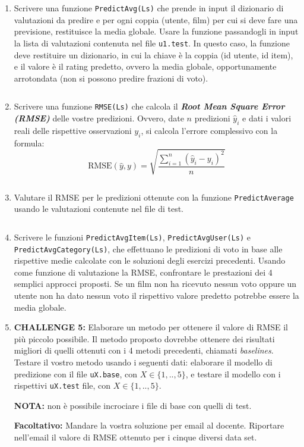 \documentclass[11pt,a4]{article}
\newcommand{\mybox}[2]{$\quad$\fbox{
\begin{minipage}{#1cm}
\hfill\vspace{#2cm}
\end{minipage}
}}
\begin{document}
\begin{enumerate}
\item Scrivere una funzione {\tt PredictAvg(Ls)} che prende in input il dizionario di valutazioni da predire
e per ogni coppia (utente, film) per cui si deve fare una previsione, restituisce la media globale.
Usare la funzione passandogli in input la lista di valutazioni contenuta nel file {\tt u1.test}.
In questo caso, la funzione deve restituire un dizionario, in cui la chiave è la coppia (id utente, id item), e il
valore è il rating predetto, ovvero la media globale, opportunamente arrotondata (non si possono predire frazioni di voto).

\mybox{15}{3}

\item Scrivere una funzione {\tt RMSE(Ls)} che calcola il {\bf {\it Root Mean Square Error (RMSE)}} delle vostre predizioni.
Ovvero, date $n$ predizioni $\hat{y}_i$ e dati i valori reali delle rispettive osservazioni $y_i$, si calcola l'errore complessivo con la formula:
$$
	\mbox{RMSE}(\hat{y}, y) = \sqrt{\frac{\sum_{i=1}^n (\hat{y}_i - y_i)^2}{n}}
$$

\mybox{15}{2.5}

\item Valutare il RMSE per le predizioni ottenute con la funzione {\tt PredictAverage} usando le valutazioni contenute nel file di test.

\mybox{15}{3}

\item Scrivere le funzioni {\tt PredictAvgItem(Ls)}, {\tt PredictAvgUser(Ls)} e {\tt PredictAvgCategory(Ls)}, che effettuano
le predizioni di voto in base alle rispettive medie calcolate con le soluzioni degli esercizi precedenti.
Usando come funzione di valutazione la RMSE, confrontare le prestazioni dei 4 semplici approcci proposti.
Se un film non ha ricevuto nessun voto oppure un utente non ha dato nessun voto
il rispettivo valore predetto potrebbe essere la media globale.

\item {\bf CHALLENGE 5:} Elaborare un metodo per ottenere il valore di RMSE il più piccolo possibile. Il metodo proposto
dovrebbe ottenere dei risultati migliori di quelli ottenuti con i 4 metodi precedenti, chiamati {\it baselines}.
Testare il vostro metodo usando i seguenti dati: elaborare il modello di predizione con il file {\tt uX.base}, con $X \in \{1,..,5\}$,
e testare il modello con i rispettivi {\tt uX.test} file, con $X \in \{1,..,5\}$. 

{\bf NOTA:} non è possibile incrociare i file di base con quelli di test.

{\bf Facoltativo:} Mandare la vostra soluzione per email al docente. Riportare nell'email il valore di RMSE ottenuto per i cinque diversi data set.


\end{enumerate}
\end{document}
